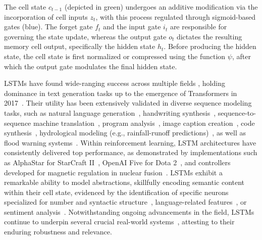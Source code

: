 The cell state $c_{t-1}$ (depicted in green) undergoes an additive modification via the incorporation of cell inputs $z_t$, with this process regulated through sigmoid-based gates (blue). The forget gate $f_t$ and the input gate $i_t$ are responsible for governing the state update, whereas the output gate $o_t$ dictates the resulting memory cell output, specifically the hidden state $h_t$. Before producing the hidden state, the cell state is first normalized or compressed using the function $\psi$, after which the output gate modulates the final hidden state.

LSTMs have found wide-ranging success across multiple fields \citep{Hochreiter:01,Hochreiter:07,Schmidhuber:15}, holding dominance in text generation tasks up to the emergence of Transformers in 2017~\citep{Vaswani:17}. Their utility has been extensively validated in diverse sequence modeling tasks, such as natural language generation~\citep{Graves:13,Karpathy:15blog}, handwriting synthesis~\citep{Graves:13}, sequence-to-sequence machine translation~\citep{Sutskever:14nips}, program analysis~\citep{Zaremba:14arxiv}, image caption creation~\citep{Karpathy:15,Hossain:19}, code synthesis~\citep{Karpathy:15blog}, hydrological modeling (e.g., rainfall-runoff predictions)~\citep{Kratzert:18,Kratzert:19}, as well as flood warning systems~\citep{Nearing:24}. Within reinforcement learning, LSTM architectures have consistently delivered top performance, as demonstrated by implementations such as AlphaStar for StarCraft II~\citep{Vinyals:17short}, OpenAI Five for Dota 2~\citep{OpenAI:19}, and controllers developed for magnetic regulation in nuclear fusion~\citep{Degrave:22short}. LSTMs exhibit a remarkable ability to model abstractions, skillfully encoding semantic content within their cell state, evidenced by the identification of specific neurons specialized for number and syntactic structure~\citep{Lakretz:19}, language-related features~\citep{Bau:19}, or sentiment analysis~\citep{Radford:17arxiv}. Notwithstanding ongoing advancements in the field, LSTMs continue to underpin several crucial real-world systems~\citep{Degrave:22short,Nearing:24}, attesting to their enduring robustness and relevance.

